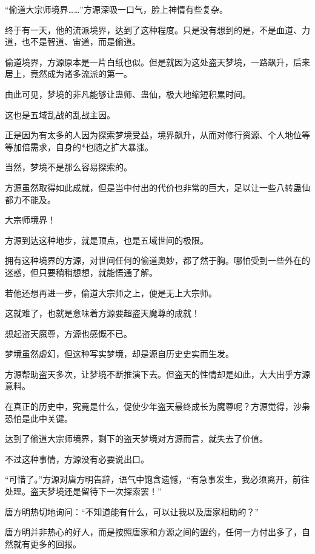 
\begin{this_body}

“偷道大宗师境界……”方源深吸一口气，脸上神情有些复杂。

终于有一天，他的流派境界，达到了这种程度。只是没有想到的是，不是血道、力道，也不是智道、宙道，而是偷道。

偷道境界，方源原本是一片白纸也似。但是就因为这处盗天梦境，一路飙升，后来居上，竟然成为诸多流派的第一。

由此可见，梦境的非凡能够让蛊师、蛊仙，极大地缩短积累时间。

这也是五域乱战的乱战主因。

正是因为有太多的人因为探索梦境受益，境界飙升，从而对修行资源、个人地位等等加倍需求，自身的*也随之扩大暴涨。

当然，梦境不是那么容易探索的。

方源虽然取得如此成就，但是当中付出的代价也非常的巨大，足以让一些八转蛊仙都力不能及。

大宗师境界！

方源到达这种地步，就是顶点，也是五域世间的极限。

拥有这种境界的方源，对世间任何的偷道奥妙，都了然于胸。哪怕受到一些外在的迷惑，但只要稍稍想想，就能悟通了解。

若他还想再进一步，偷道大宗师之上，便是无上大宗师。

这就难了，也就是意味着方源要超盗天魔尊的成就！

想起盗天魔尊，方源也感慨不已。

梦境虽然虚幻，但这种写实梦境，却是源自历史史实而生发。

方源帮助盗天多次，让梦境不断推演下去。但盗天的性情却是如此，大大出乎方源意料。

在真正的历史中，究竟是什么，促使少年盗天最终成长为魔尊呢？方源觉得，沙枭恐怕是此中关键。

达到了偷道大宗师境界，剩下的盗天梦境对方源而言，就失去了价值。

不过这种事情，方源没有必要说出口。

“可惜了。”方源对唐方明告辞，语气中饱含遗憾，“有急事发生，我必须离开，前往处理。盗天梦境还是留待下一次探索罢！”

唐方明热切地询问：“不知道能有什么，可以让我以及唐家相助的？”

唐方明并非热心的好人，而是按照唐家和方源之间的盟约，任何一方付出多了，自然就有更多的回报。


\end{this_body}

